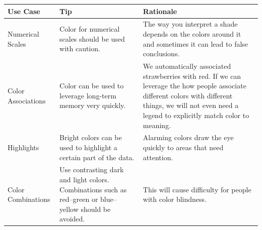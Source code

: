 \documentclass[]{book}
\begin{document}
\begin{longtable}[]{@{}lll@{}}
\toprule
\begin{minipage}[b]{0.11\columnwidth}\raggedright
Use Case\strut
\end{minipage} & \begin{minipage}[b]{0.34\columnwidth}\raggedright
Tip\strut
\end{minipage} & \begin{minipage}[b]{0.46\columnwidth}\raggedright
Rationale\strut
\end{minipage}\tabularnewline
\midrule
\endhead
\begin{minipage}[t]{0.11\columnwidth}\raggedright
Numerical Scales\strut
\end{minipage} & \begin{minipage}[t]{0.34\columnwidth}\raggedright
Color for numerical scales should be used with caution.\strut
\end{minipage} & \begin{minipage}[t]{0.46\columnwidth}\raggedright
The way you interpret a shade depends on the colors around it and sometimes it can lead to false conclusions.\strut
\end{minipage}\tabularnewline
\begin{minipage}[t]{0.11\columnwidth}\raggedright
Color Associations\strut
\end{minipage} & \begin{minipage}[t]{0.34\columnwidth}\raggedright
Color can be used to leverage long-term memory very quickly.\strut
\end{minipage} & \begin{minipage}[t]{0.46\columnwidth}\raggedright
We automatically associated strawberries with red. If we can leverage the how people associate different colors with different things, we will not even need a legend to explicitly match color to meaning.\strut
\end{minipage}\tabularnewline
\begin{minipage}[t]{0.11\columnwidth}\raggedright
Highlights\strut
\end{minipage} & \begin{minipage}[t]{0.34\columnwidth}\raggedright
Bright colors can be used to highlight a certain part of the data.\strut
\end{minipage} & \begin{minipage}[t]{0.46\columnwidth}\raggedright
Alarming colors draw the eye quickly to areas that need attention.\strut
\end{minipage}\tabularnewline
\begin{minipage}[t]{0.11\columnwidth}\raggedright
Color Combinations\strut
\end{minipage} & \begin{minipage}[t]{0.34\columnwidth}\raggedright
Use contrasting dark and light colors. Combinations such as red--green or blue-- yellow should be avoided.\strut
\end{minipage} & \begin{minipage}[t]{0.46\columnwidth}\raggedright
This will cause difficulty for people with color blindness.\strut
\end{minipage}\tabularnewline
\bottomrule
\end{longtable}
\end{document}

